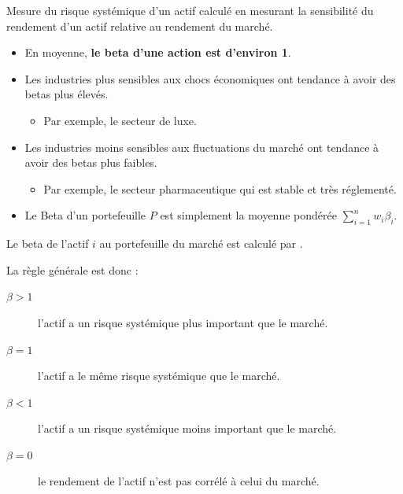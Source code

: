 \documentclass[10pt, french]{article}
\begin{document}
\begin{multicols*}{2}
\begin{definitionNOHFILLsub}
\end{definitionNOHFILLsub}

\begin{definitionNOHFILLsub}
Mesure du risque systémique d'un actif calculé en mesurant la sensibilité du rendement d'un actif relative au rendement du marché.
\begin{itemize}
	\item	En moyenne, \textbf{le beta d'une action est d'environ 1}.
	\item	Les industries plus sensibles aux chocs économiques ont tendance à avoir des betas plus élevés.
		\begin{itemize}
		\item	 Par exemple, le secteur de luxe.
		\end{itemize}
	\item	Les industries moins sensibles aux fluctuations du marché ont tendance à avoir des betas plus faibles.
		\begin{itemize}
		\item	Par exemple, le secteur pharmaceutique qui est stable et très réglementé.
		\end{itemize}
	\item	Le Beta d'un portefeuille $P$ est simplement la moyenne pondérée $\sum_{i = 1}^{n} w_{i} \beta_{i}$.
\end{itemize}

\tcbline

Le beta de l'actif $i$ au portefeuille du marché est calculé par .

La règle générale est donc :
\begin{description}
	\item[$\beta > 1$]	l'actif a un risque systémique plus important que le marché.
	\item[$\beta = 1$]	l'actif a le même risque systémique que le marché.
	\item[$\beta < 1$]	l'actif a un risque systémique moins important que le marché.
	\item[$\beta = 0$]	le rendement de l'actif n'est pas corrélé à celui du marché.
\end{description}
\end{definitionNOHFILLsub}


\end{multicols*}
\end{document}

